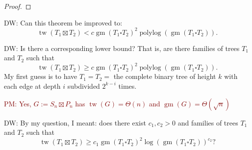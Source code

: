 \documentclass[lotsofwhite]{patmorin}
\renewcommand{\geq}{\geqslant}
\renewcommand{\leq}{\leqslant}
\DeclareMathOperator{\polylog}{polylog}
\DeclareMathOperator{\tw}{tw}
\DeclareMathOperator{\gm}{gm}
\newcommand{\david}[1]{{\color{orange} DW: #1}}
\newcommand{\pat}[1]{\textcolor{Maroon}{PM: #1}}
\theoremstyle{plain}
\theoremstyle{definition}
\begin{document}
\begin{proof}



\end{proof}

\david{Can this theorem be improved to:
$$\tw(T_1\boxtimes T_2) < c \gm(T_1\square T_2)^2 \polylog(\gm(T_1\square T_2)).$$}

\david{Is there a corresponding lower bound?
That is, are there families of trees $T_1$ and $T_2$ such that
$$\tw(T_1\boxtimes T_2) \geq  c \gm(T_1\square T_2)^2 \polylog(\gm(T_1\square T_2)).$$
My first guess is to have $T_1=T_2=$ the complete binary tree of height $k$ with each edge at depth $i$ subdivided $2^{k-i}$ times.
}

\pat{Yes, $G:=S_n\boxtimes P_n$ has $\tw(G)=\Theta(n)$ and $\gm(G)=\Theta(\sqrt{n})$}

\david{By my question, I meant: does there exist $c_1,c_2>0$ and families of trees $T_1$ and $T_2$ such that
$$\tw(T_1\boxtimes T_2) \geq  c_1 \gm(T_1\square T_2)^2 \log(\gm(T_1\square T_2))^{c_2}?$$
}
\end{document}
